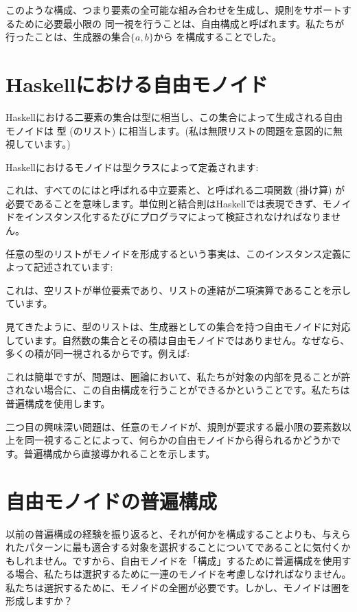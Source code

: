 このような構成、つまり要素の全可能な組み合わせを生成し、規則をサポートするために必要最小限の
同一視を行うことは、自由構成と呼ばれます。私たちが行ったことは、生成器の集合$\{a, b\}$から
を構成することでした。

\section{Haskellにおける自由モノイド}

Haskellにおける二要素の集合は型に相当し、この集合によって生成される自由モノイドは
\code{{[}Bool{]}}型 (のリスト) に相当します。(私は無限リストの問題を意図的に無視しています。) 

Haskellにおけるモノイドは型クラスによって定義されます: 

これは、すべてのにはと呼ばれる中立要素と、と呼ばれる二項関数 (掛け算) が必要であることを意味します。単位則と結合則はHaskellでは表現できず、モノイドをインスタンス化するたびにプログラマによって検証されなければなりません。

任意の型のリストがモノイドを形成するという事実は、このインスタンス定義によって記述されています: 

これは、空リスト\code{{[}{]}}が単位要素であり、リストの連結\code{(++)}が二項演算であることを示しています。

見てきたように、型のリストは、生成器としての集合を持つ自由モノイドに対応しています。自然数の集合とその積は自由モノイドではありません。なぜなら、多くの積が同一視されるからです。例えば: 

これは簡単ですが、問題は、圏論において、私たちが対象の内部を見ることが許されない場合に、この自由構成を行うことができるかということです。私たちは普遍構成を使用します。

二つ目の興味深い問題は、任意のモノイドが、規則が要求する最小限の要素数以上を同一視することによって、何らかの自由モノイドから得られるかどうかです。普遍構成から直接導かれることを示します。

\section{自由モノイドの普遍構成}

以前の普遍構成の経験を振り返ると、それが何かを構成することよりも、与えられたパターンに最も適合する対象を選択することについてであることに気付くかもしれません。ですから、自由モノイドを「構成」するために普遍構成を使用する場合、私たちは選択するために一連のモノイドを考慮しなければなりません。私たちは選択するために、モノイドの全圏が必要です。しかし、モノイドは圏を形成しますか？

